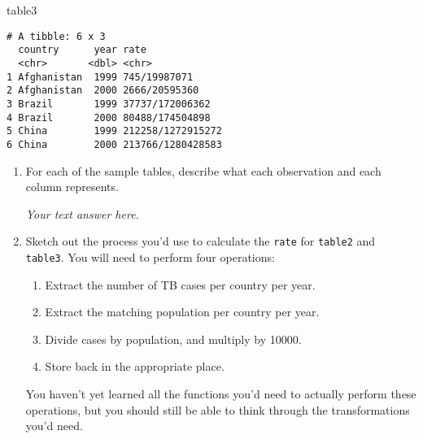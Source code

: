 \documentclass[
  letterpaper,
  DIV=11,
  numbers=noendperiod]{scrreprt}
\newenvironment{Shaded}{\begin{snugshade}}{\end{snugshade}}
\newcommand{\NormalTok}[1]{\textcolor[rgb]{0.00,0.23,0.31}{#1}}
\providecommand{\tightlist}{%
  \setlength{\itemsep}{0pt}\setlength{\parskip}{0pt}}\usepackage{longtable,booktabs,array}
\begin{document}
\begin{tcolorbox}
\begin{Shaded}
\begin{Highlighting}[]
\NormalTok{table3}
\end{Highlighting}
\end{Shaded}

\begin{verbatim}
# A tibble: 6 x 3
  country      year rate             
  <chr>       <dbl> <chr>            
1 Afghanistan  1999 745/19987071     
2 Afghanistan  2000 2666/20595360    
3 Brazil       1999 37737/172006362  
4 Brazil       2000 80488/174504898  
5 China        1999 212258/1272915272
6 China        2000 213766/1280428583
\end{verbatim}

\end{tcolorbox}

\begin{enumerate}
\def\labelenumi{\arabic{enumi}.}
\item
  For each of the sample tables, describe what each observation and each
  column represents.

  \begin{tcolorbox}[enhanced jigsaw, left=2mm, rightrule=.15mm, bottomtitle=1mm, opacitybacktitle=0.6, leftrule=.75mm, opacityback=0, colframe=quarto-callout-note-color-frame, bottomrule=.15mm, coltitle=black, toptitle=1mm, colback=white, titlerule=0mm, colbacktitle=quarto-callout-note-color!10!white, title={Answer}, toprule=.15mm, breakable, arc=.35mm]

  \emph{Your text answer here.}

  \end{tcolorbox}
\item
  Sketch out the process you'd use to calculate the \texttt{rate} for
  \texttt{table2} and \texttt{table3}. You will need to perform four
  operations:

  \begin{enumerate}
  \def\labelenumii{\alph{enumii}.}
  \tightlist
  \item
    Extract the number of TB cases per country per year.
  \item
    Extract the matching population per country per year.
  \item
    Divide cases by population, and multiply by 10000.
  \item
    Store back in the appropriate place.
  \end{enumerate}

  You haven't yet learned all the functions you'd need to actually
  perform these operations, but you should still be able to think
  through the transformations you'd need.


\end{enumerate}
\end{document}
